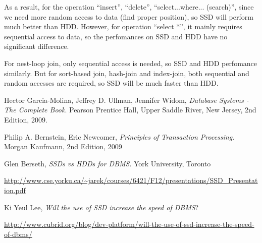 \documentclass{article}
\begin{document}
As a result, for the operation ``insert'', ``delete'', ``select...where... (search)'', since we need more random access to data (find proper position), so SSD will perform much better than HDD. However, for operation ``select *'', it mainly requires sequential access to data, so the perfomances on SSD and HDD have no significant difference.

For nest-loop join, only sequential access is needed, so SSD and HDD perfomance similarly. But for sort-based join, hash-join and index-join, both sequential and random accesses are required, so SSD will be much faster than HDD.

\goodbreak

\newpage

\begin{thebibliography}{9}

  Hector Garcia-Molina, Jeffrey D. Ullman, Jennifer Widom,
  \emph{Database Systems - The Complete Book}.
  Pearson Prentice Hall, Upper Saddle River, New Jersey,
  2nd Edition,
  2009.
  
   Philip A. Bernstein, Eric Newcomer, 
   \emph{Principles of Transaction Processing}.
   Morgan Kaufmann, 2nd Edition, 2009
   
\bibitem{}
   Glen Berseth,
   \emph{SSDs vs HDDs for DBMS}.
   York University, Toronto
   
   \url{http://www.cse.yorku.ca/~jarek/courses/6421/F12/presentations/SSD_Presentation.pdf}
   
\bibitem{}
   Ki Yeul Lee,
   \emph{Will the use of SSD increase the speed of DBMS}?
   
   \url{http://www.cubrid.org/blog/dev-platform/will-the-use-of-ssd-increase-the-speed-of-dbms/}

\end{thebibliography}
\end{document}
